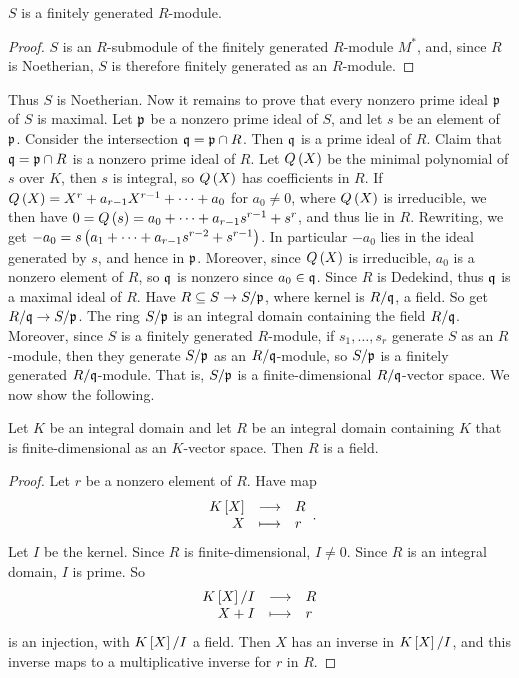 \begin{corollary}
$ S $ is a finitely generated $ R $-module.
\end{corollary}

\begin{proof}
$ S $ is an $ R $-submodule of the finitely generated $ R $-module $ M^* $, and, since $ R $ is Noetherian, $ S $ is therefore finitely generated as an $ R $-module.
\end{proof}

Thus $ S $ is Noetherian. Now it remains to prove that every nonzero prime ideal $ \mathfrak{p} $ of $ S $ is maximal. Let $ \mathfrak{p} $ be a nonzero prime ideal of $ S $, and let $ s $ be an element of $ \mathfrak{p} $. Consider the intersection $ \mathfrak{q} = \mathfrak{p} \cap R $. Then $ \mathfrak{q} $ is a prime ideal of $ R $. Claim that $ \mathfrak{q} = \mathfrak{p} \cap R $ is a nonzero prime ideal of $ R $. Let $ Q\br{X} $ be the minimal polynomial of $ s $ over $ K $, then $ s $ is integral, so $ Q\br{X} $ has coefficients in $ R $. If $ Q\br{X} = X^r + a_{r - 1}X^{r - 1} + \dots + a_0 $ for $ a_0 \ne 0 $, where $ Q\br{X} $ is irreducible, we then have $ 0 = Q\br{s} = a_0 + \dots + a_{r - 1}s^{r - 1} + s^r $, and thus lie in $ R $. Rewriting, we get $ -a_0 = s\br{a_1 + \dots + a_{r - 1}s^{r - 2} + s^{r - 1}} $. In particular $ -a_0 $ lies in the ideal generated by $ s $, and hence in $ \mathfrak{p} $. Moreover, since $ Q\br{X} $ is irreducible, $ a_0 $ is a nonzero element of $ R $, so $ \mathfrak{q} $ is nonzero since $ a_0 \in \mathfrak{q} $. Since $ R $ is Dedekind, thus $ \mathfrak{q} $ is a maximal ideal of $ R $. Have $ R \subseteq S \to S / \mathfrak{p} $, where kernel is $ R / \mathfrak{q} $, a field. So get $ R / \mathfrak{q} \to S / \mathfrak{p} $. The ring $ S / \mathfrak{p} $ is an integral domain containing the field $ R / \mathfrak{q} $. Moreover, since $ S $ is a finitely generated $ R $-module, if $ s_1, \dots, s_r $ generate $ S $ as an $ R $-module, then they generate $ S / \mathfrak{p} $ as an $ R / \mathfrak{q} $-module, so $ S / \mathfrak{p} $ is a finitely generated $ R / \mathfrak{q} $-module. That is, $ S / \mathfrak{p} $ is a finite-dimensional $ R / \mathfrak{q} $-vector space. We now show the following.

\begin{lemma}
\label{lem:12.3.7}
Let $ K $ be an integral domain and let $ R $ be an integral domain containing $ K $ that is finite-dimensional as an $ K $-vector space. Then $ R $ is a field.
\end{lemma}

\begin{proof}
Let $ r $ be a nonzero element of $ R $. Have map
$$ \function{K\sbr{X}}{R}{X}{r}. $$
Let $ I $ be the kernel. Since $ R $ is finite-dimensional, $ I \ne 0 $. Since $ R $ is an integral domain, $ I $ is prime. So
$$ \function{K\sbr{X} / I}{R}{X + I}{r} $$
is an injection, with $ K\sbr{X} / I $ a field. Then $ X $ has an inverse in $ K\sbr{X} / I $, and this inverse maps to a multiplicative inverse for $ r $ in $ R $.
\end{proof}

